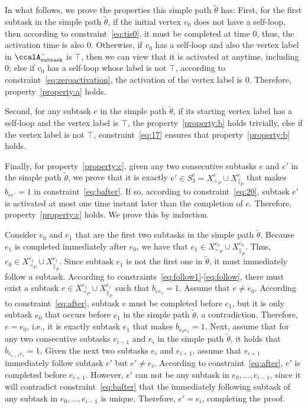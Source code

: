 \documentclass[Afour,sageh,times]{sagej}
\newcommand{\auto}[1]{\ccalA_{\textup{#1}}}
\begin{document}
{{In what follows, we prove the properties this simple path $\tilde{\theta}$ has: First, for the first subtask in the simple path $\tilde{\theta}$, if the initial vertex $v_0$ does not have a self-loop, then according to constraint~\eqref{eq:tis0}, it must be completed at time 0, thus, the activation time is also 0. Otherwise, if $v_0$ has a self-loop and also the vertex label in $\auto{subtask}^-$ is $\top$, then we can view that it is activated at anytime, including 0; else if $v_0$ has a self-loop  whose label is not $\top$, according to constraint~\eqref{eq:zeroactivation}, the activation of the vertex label is 0. Therefore, property~\ref{property:a} holds.

Second, for any subtask $e$ in the simple path $\tilde{\theta}$, if its starting vertex label has a self-loop and the vertex label is $\top$, the property~\ref{property:b} holds trivially, else if the vertex label is not $\top$,  constraint~\eqref{eq:17} ensures that  property~\ref{property:b} holds.

Finally,  for  property~\ref{property:c}, given any two consecutive subtasks $e$ and $e'$ in the simple path $\tilde{\theta}$, we  prove that it is exactly $e' \in S_3^e = X^e_{\succ_{P}} \cup X^e_{\|_{P}}$ that makes $b_{ee'}=1$ in constraint~\eqref{eq:bafter}. If so, according to constraint~\eqref{eq:20}, subtask $e'$ is activated at most one time instant later than the completion of $e$. Therefore, property~\ref{property:c} holds. We prove this  by induction.

Consider $e_0$ and $e_1$ that are the first two subtasks in the simple path $\tilde{\theta}$. Because $e_1$ is completed immediately after $e_0$, we have that $e_1\in X^{e_0}_{\succ_{P}} \cup X^{e_0}_{\|_{P}} $. Thus, ${e_0} \in X^{e_1}_{\prec_{P}} \cup X^{e_1}_{\|_{P}}$. Since subtask $e_1$ is not the first one in $\tilde{\theta}$, it must immediately follow a subtask. According to constraints~\eqref{eq:follow1}-\eqref{eq:follow}, there must exist  a subtask $e \in X^{e_1}_{\prec_{P}} \cup X^{e_1}_{\|_{P}} $ such that $b_{e e_1}=1$.
Assume that $e \neq e_0$. According to constraint~\eqref{eq:after}, subtask $e$ must be completed before $e_1$, but it is only subtask $e_0$ that occurs before $e_1$ in the simple path $\tilde{\theta}$, a contradiction. Therefore, $e  = e_0$, i.e., it is exactly subtask $e_1$ that makes $b_{e_0 e_1}=1$. Next,  assume that for any two consecutive subtasks $e_{i-1}$ and $e_{i}$ in the simple path $\tilde{\theta}$,  it holds that $b_{e_{i-1} e_i} = 1$. Given the next two subtasks $e_{i}$ and $e_{i+1}$, assume that $e_{i+1}$ immediately follow subtask $e'$ but $e' \neq e_i$. According to constraint~\eqref{eq:after}, $e'$ is completed before $e_{i+1}$. However, $e'$ can not be any subtask in $e_0, \ldots, e_{i-1}$, since it will contradict constraint~\eqref{eq:bafter} that the immediately following subtask of any subtask in $e_0, \ldots, e_{i-1}$ is unique. Therefore, $e' = e_i$, completing the proof.




}}
\end{document}

